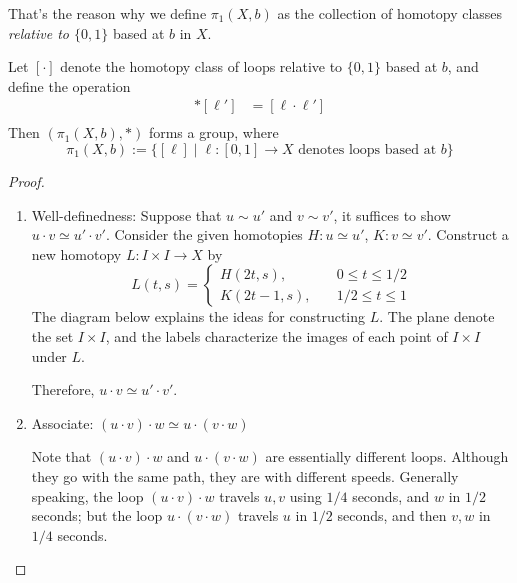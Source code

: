 That's the reason why we define $\pi_1(X,b)$ as the collection of homotopy classes \emph{relative to $\{0,1\}$} based at $b$ in $X$.
\begin{proposition}
Let $[\cdot]$ denote the homotopy class of loops relative to $\{0,1\}$ based at $b$, and define the operation
\begin{align*}
[\ell]*[\ell']&=[\ell\cdot\ell']\\
\end{align*}
Then $(\pi_1(X,b),*)$ forms a group, where
\[
\pi_1(X,b) := \{[\ell]\mid \ell:[0,1]\to X\text{ denotes loops based at $b$}\} 
\]
\end{proposition}
\begin{proof}
\begin{enumerate}
\item
Well-definedness:
Suppose that $u\sim u'$ and $v\sim v'$, it suffices to show $u\cdot v\simeq u'\cdot v'$.
Consider the given homotopies $H:u\simeq u'$, $K:v\simeq v'$.
Construct a new homotopy $L:I\times I\to X$ by
\[
L(t,s)=\left\{
\begin{aligned}
H(2t,s),&\quad 0\le t\le 1/2\\
K(2t-1,s),&\quad 1/2\le t\le 1
\end{aligned}
\right.
\] 
The diagram below explains the ideas for constructing $L$.
The plane denote the set $I\times I$, and the labels characterize the images of each point of $I\times I$ under $L$.
\begin{figure}[H]
	\label{Fig:11:7}
\end{figure}
Therefore, $u\cdot v\simeq u'\cdot v'$.
\item
Associate: $(u\cdot v)\cdot w\simeq u\cdot(v\cdot w)$

Note that $(u\cdot v)\cdot w$ and $u\cdot(v\cdot w)$ are essentially different loops. Although they go with the same path, they are with different speeds. Generally speaking, the loop $(u\cdot v)\cdot w$ travels $u,v$ using $1/4$ seconds, and $w$ in $1/2$ seconds; but the loop $u\cdot(v\cdot w)$ travels $u$ in $1/2$ seconds, and then $v,w$ in $1/4$ seconds.


\end{enumerate}
\end{proof}
